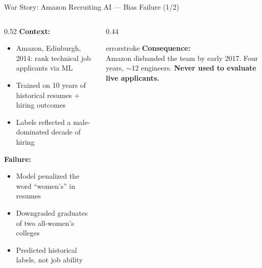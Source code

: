\documentclass[aspectratio=169, 12pt]{beamer}
\begin{document}
\begin{frame}{War Story: Amazon Recruiting AI --- Bias Failure (1/2)}
\note{
%
%
%
}

\footnotesize
\vspace{-3pt}
\setlength{\itemsep}{-1pt}
\begin{columns}[T]
  \begin{column}{0.52\textwidth}
    \textbf{Context:}
    \begin{itemize}\setlength\itemsep{-1pt}
      \item Amazon, Edinburgh, 2014: rank technical job applicants via ML
      \item Trained on 10 years of historical resumes + hiring outcomes
      \item Labels reflected a male-dominated decade of hiring
    \end{itemize}

    \vspace{0.03cm}
    \textbf{Failure:}
    \begin{itemize}\setlength\itemsep{-1pt}
      \item Model penalized the word ``women's'' in resumes
      \item Downgraded graduates of two all-women's colleges
      \item Predicted historical labels, not job ability
    \end{itemize}
  \end{column}
  \begin{column}{0.44\textwidth}
    \begin{mlsyscard}{errorstroke}
    \textbf{Consequence:}\\[0.03cm]
    {\scriptsize Amazon disbanded the team by early 2017. Four years, $\sim$12 engineers. \textbf{Never used to evaluate live applicants.}}
    \end{mlsyscard}
  \end{column}
\end{columns}


\end{frame}
\end{document}
